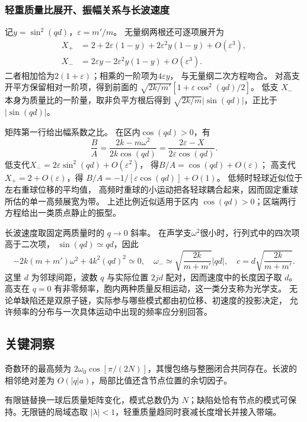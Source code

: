 \documentclass[UTF8,fontset=fandol,a4paper,11pt]{ctexart}
\begin{document}
\subsubsection*{轻重质量比展开、振幅关系与长波速度}
记$y=\sin^2(qd)$，$\varepsilon=m'/m$。
无量纲两根还可逐项展开为
\[
\begin{aligned}
X_+&=2+2\varepsilon(1-y)+2\varepsilon^2y(1-y)+O(\varepsilon^3),\\
X_-&=2\varepsilon y-2\varepsilon^2y(1-y)+O(\varepsilon^3).
\end{aligned}
\]
二者相加恰为$2(1+\varepsilon)$；相乘的一阶项为$4\varepsilon y$，
与无量纲二次方程吻合。
对高支开平方保留相对一阶项，得到前面的
$\sqrt{2k/m'}[1+\varepsilon\cos^2(qd)/2]$。
低支 $X_-$ 本身为质量比的一阶量，取非负平方根后得到 $\sqrt{2k/m}|\sin(qd)|$，正比于 $|\sin(qd)|$。

矩阵第一行给出幅系数之比。
在区内$\cos(qd)>0$，有
\[
\frac BA=\frac{2k-m\omega^2}{2k\cos(qd)}
=\frac{2\varepsilon-X}{2\varepsilon\cos(qd)}.
\]
低支代$X_-=2\varepsilon\sin^2(qd)+O(\varepsilon^2)$，
得$B/A=\cos(qd)+O(\varepsilon)$；
高支代$X_+=2+O(\varepsilon)$，得
$B/A=-1/[\varepsilon\cos(qd)]+O(1)$。
低频时轻球近似位于左右重球位移的平均值，
高频时重球的小运动把各轻球耦合起来，因而固定重球所估的单一高频展宽为带。
上述比例近似适用于区内 $\cos(qd)>0$；区端两行方程给出一类质点静止的振型。

长波速度取固定两质量时的 $q\to0$ 斜率。
在声学支$\omega^2$很小时，行列式中的四次项高于二次项，
$\sin(qd)\simeq qd$，因此
\[
-2k(m+m')\omega^2+4k^2(qd)^2\simeq0,
\quad\omega_-\simeq\sqrt{\frac{2k}{m+m'}}|qd|,
\quad c=d\sqrt{\frac{2k}{m+m'}}.
\]
这里 $d$ 为邻球间距，波数 $q$ 与实际位置 $2jd$ 配对，因而速度中的长度因子取 $d$。高支在 $q=0$ 有非零频率，胞内两种质量反相运动，这一类分支称为光学支。
无论单缺陷还是双原子链，实际参与哪些模式都由初位移、初速度的投影决定，
允许频率的分布与一次具体运动中出现的频率应分别回答。




\subsection*{关键洞察}

奇数环的最高频为 $2\omega_0\cos[\pi/(2N)]$，其慢包络与整圈闭合共同存在。长波的相邻绝对差为 $O(|q|a)$，局部比值还含节点位置的余切因子。

有限链替换一球后质量矩阵变化，模式总数仍为 $N$；缺陷处恰有节点的模式可保持。无限链的局域态取 $|\lambda|<1$，轻重质量趋同时衰减长度增长并接入带端。
\end{document}
